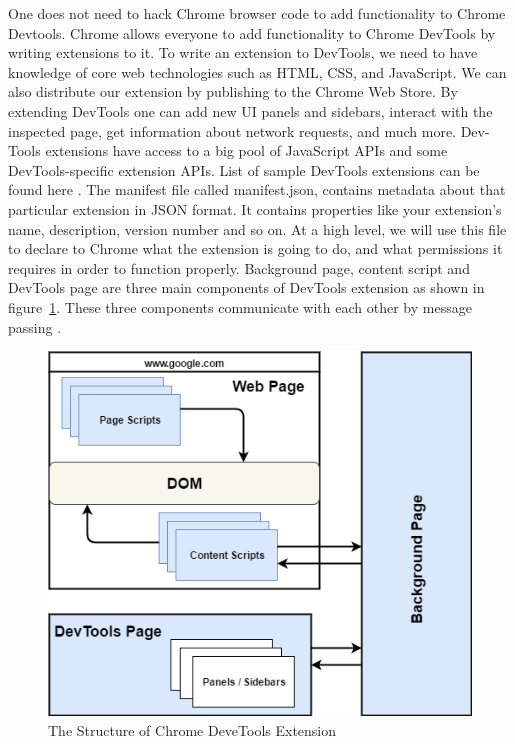 One does not need to hack Chrome browser code to add functionality to Chrome Devtools. Chrome allows everyone to add functionality to Chrome DevTools by writing extensions to it. To write an extension to DevTools, we need to have knowledge of core web technologies such as HTML, CSS, and JavaScript. We can also distribute our extension by publishing to the Chrome Web Store. By extending DevTools one can add new UI panels and sidebars, interact with the inspected page, get information about network requests, and much more. Dev-Tools extensions have access to a big pool of JavaScript APIs \cite{CDJAPIs} and some DevTools-specific extension APIs. List of sample DevTools extensions can be found here \cite{CDSampExt}.
The manifest file called manifest.json, contains metadata about that particular extension in JSON format. It contains properties like your extension's name, description, version number and so on. At a high level, we will use this file to declare to Chrome what the extension is going to do, and what permissions it requires in order to function properly.
Background page, content script and DevTools page are three main components of DevTools extension as shown in figure~\ref{fig:structure_of_chrome_devtools_extension}. These three components communicate with each other by message passing \cite{CDMesgPassing}.
\begin{figure}[!h]
	\centering
	\includegraphics[scale=0.5,trim=0 0 0 0]{gfx/ChromeDevToolsExtension.png}
	\caption{The Structure of Chrome DeveTools Extension}
	\label{fig:structure_of_chrome_devtools_extension}
\end{figure} 
